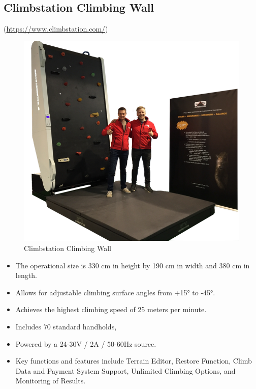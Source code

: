 \subsection{Climbstation Climbing Wall}
(\url{https://www.climbstation.com/})
\begin{figure}[H]
    \centering
    \includegraphics[width=0.9\linewidth]{figs/climbstation.png}
    \caption{Climbstation Climbing Wall}
\end{figure}
    \begin{itemize}
        \item The operational size is 330 cm in height by 190 cm in width and 380 cm in length.
        \item Allows for adjustable climbing surface angles from +15° to -45°.
        \item Achieves the highest climbing speed of 25 meters per minute.
        \item Includes 70 standard handholds, 
        \item Powered by a 24-30V / 2A / 50-60Hz source.
        \item Key functions and features include Terrain Editor, Restore Function, Climb Data and Payment System Support, Unlimited Climbing Options, and Monitoring of Results.
    \end{itemize}

